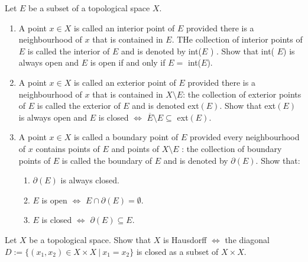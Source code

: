 \begin{problem}
	Let \(E\) be a subset of a topological space \( X \). 
	\begin{enumerate}[a]
		\item A point \( x \in X \) is called an interior point of \( E \) provided there is a neighbourhood of \( x \) that is contained in \( E \). THe collection of interior points of \( E \) is called the interior of \( E \) and is denoted by int(\( E \) ) . Show that int( \( E \)) is always open and \( E \) is open if and only if \( E = \) int(\(E\)). 
		\item A point \( x \in X \) is called an exterior point of \( E \) provided there is a neighbourhood of \( x \) that is contained in \( X \setminus E \): the collection of exterior points of \( E \) is called the exterior of  \( E \) and is denoted ext\((E)\). Show that ext\( (E) \) is always open and \( E \) is closed \( \iff \) \( \overline{E} \setminus E \subseteq \) ext\( (E) \). 
		\item A point \( x \in X \) is called a boundary point of \( E \) provided every neighbourhood of \( x \) contains points of \( E \) and points of \( X \setminus E \) : the collection of boundary points of \( E \) is called the boundary of \( E \) and is denoted by \( \partial(E)\). Show that: 
		\begin{enumerate}[a]
			\item \( \partial(E) \) is always closed. 
			\item \( E \) is open \( \iff \) \( E \cap \partial(E) = \emptyset \). 
			\item \( E \) is closed \( \iff \) \( \partial(E) \subseteq E \). 
		\end{enumerate}
	\end{enumerate}
\end{problem}

\begin{problem}
	Let \( X \) be a topological space. Show that \( X \) is Hausdorff \( \iff \) the diagonal \( D := \{ (x_1, x_2) \in X \times X\ |\ x_1 = x_2 \} \) is closed as a subset of \( X \times X \). 
\end{problem}


